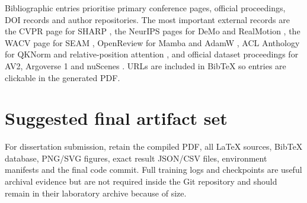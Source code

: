 Bibliographic entries prioritise primary conference pages, official proceedings, DOI records and author repositories. The most important external records are the CVPR page for SHARP \cite{prutsch2026sharp}, the NeurIPS pages for DeMo and RealMotion \cite{zhang2024demo,song2024realmotion}, the WACV page for SEAM \cite{prutsch2026seam}, OpenReview for Mamba and AdamW \cite{gu2024mamba,loshchilov2019adamw}, ACL Anthology for QKNorm and relative-position attention \cite{henry2020qknorm,shaw2018relative}, and official dataset proceedings for AV2, Argoverse 1 and nuScenes \cite{wilson2021av2,chang2019argoverse,caesar2020nuscenes}. URLs are included in BibTeX so entries are clickable in the generated PDF.

\section{Suggested final artifact set}

For dissertation submission, retain the compiled PDF, all LaTeX sources, BibTeX database, PNG/SVG figures, exact result JSON/CSV files, environment manifests and the final code commit. Full training logs and checkpoints are useful archival evidence but are not required inside the Git repository and should remain in their laboratory archive because of size.
